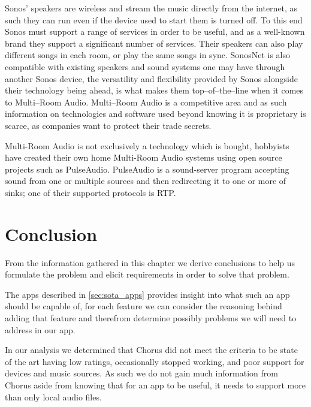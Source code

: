 Sonos' speakers are wireless and stream the music directly from the internet, as such they can run even if the device used to start them is turned off.
To this end Sonos must support a range of services in order to be useful, and as a well-known brand they support a significant number of services.
Their speakers can also play different songs in each room, or play the same songs in sync.
SonosNet is also compatible with existing speakers and sound systems one may have through another Sonos device, the versatility and flexibility provided by Sonos alongside their technology being ahead, is what makes them top--of--the--line when it comes to Multi--Room Audio.\cite{sonos2}
Multi--Room Audio is a competitive area and as such information on technologies and software used beyond knowing it is proprietary is scarce, as companies want to protect their trade secrets.

Multi-Room Audio is not exclusively a technology which is bought, hobbyists have created their own home Multi-Room Audio systems using open source projects such as PulseAudio.\cite{pulseAudioHobbyist}
PulseAudio is a sound-server program accepting sound from one or multiple sources and then redirecting it to one or more of sinks; one of their supported protocols is \ac{RTP}.\cite{pulseAudioModules}


\section{Conclusion}
From the information gathered in this chapter we derive conclusions to help us formulate the problem and elicit requirements in order to solve that problem.

The apps described in \cref{sec:sota_apps} provides insight into what such an app should be capable of, for each feature we can consider the reasoning behind adding that feature and therefrom determine possibly problems we will need to address in our app.

In our analysis we determined that Chorus did not meet the criteria to be state of the art having low ratings, occasionally stopped working, and poor support for devices and music sources.
As such we do not gain much information from Chorus aside from knowing that for an app to be useful, it needs to support more than only local audio files.

